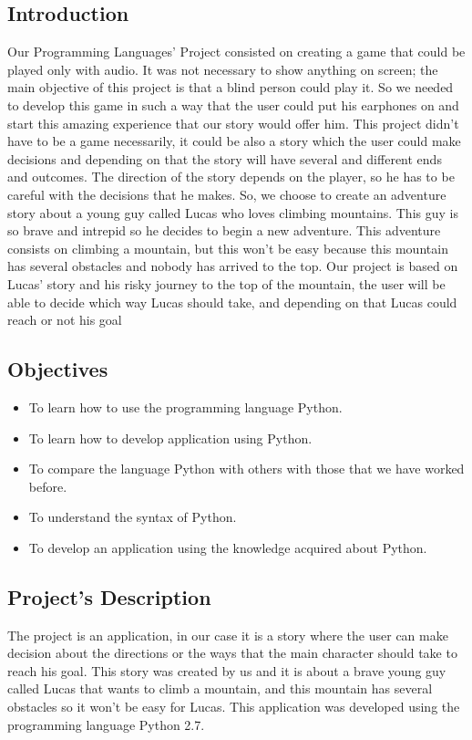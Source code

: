 \documentclass[12pt,letterpaper]{article}
\begin{document}
\subsection{Introduction}
\begin{raggedleft}
Our Programming Languages’ Project consisted on creating a game that could be played only with audio. It was not necessary to show anything on screen; the main objective of this project is that a blind person could play it. So we needed to develop this game in such a way that the user could put his earphones on and start this amazing experience that our story would offer him.
This project didn't have to be a game necessarily, it could be also a story which the user could make decisions and depending on that the story will have several and different ends and outcomes. The direction of the story depends on the player, so he has to be careful with the decisions that he makes.
So, we choose to create an adventure story about a young guy called Lucas who loves climbing mountains. This guy is so brave and intrepid so he decides to begin a new adventure. This adventure consists on climbing a mountain, but this won't be easy because this mountain has several obstacles and nobody has arrived to the top.
Our project is based on Lucas’ story and his risky journey to the top of the mountain, the user will be able to decide which way Lucas should take, and depending on that Lucas could reach or not his goal
\end{raggedleft}

\subsection{Objectives}
\begin{itemize}
\item To learn how to use the programming language Python.
\item To learn how to develop application using Python.
\item To compare the language Python with others with those that we have worked before.
\item To understand the syntax of Python.
\item To develop an application using the knowledge acquired about Python.
\end{itemize}

\subsection{Project’s Description}
\begin{raggedleft}
The project is an application, in our case it is a story where the user can make decision about the directions or the ways that the main character should take to reach his goal.
This story was created by us and it is about a brave young guy called Lucas that wants to climb a mountain, and this mountain has several obstacles so it won’t be easy for Lucas.
This application was developed using the programming language Python 2.7.
\end{raggedleft}
\end{document}
